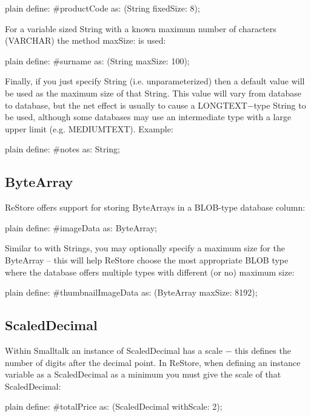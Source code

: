 \documentclass[10pt,twoside,english]{_support/latex/sbabook/sbabook}
\begin{document}
\begin{displaycode}{plain}
	define: #productCode as: (String fixedSize: 8);
\end{displaycode}

For a variable sized String with a known maximum number of characters (VARCHAR) the method maxSize: is used:

\begin{displaycode}{plain}
define: #surname as: (String maxSize: 100);
\end{displaycode}

Finally, if you just specify String (i.e. unparameterized) then a default value will be used as the maximum size of that String. This value will vary from database to database, but the net effect is usually to cause a LONGTEXT−type String to be used, although some databases may use an intermediate type with a large upper limit (e.g. MEDIUMTEXT). Example: 

\begin{displaycode}{plain}
	define: #notes as: String;
\end{displaycode}
\subsection{ByteArray}
ReStore offers support for storing ByteArrays in a BLOB-type database column:

\begin{displaycode}{plain}
	define: #imageData as: ByteArray;
\end{displaycode}

Similar to with Strings, you may optionally specify a maximum size for the ByteArray – this will help ReStore choose the most appropriate BLOB type where the database offers multiple types with different (or no) maximum size:

\begin{displaycode}{plain}
	define: #thumbnailImageData as: (ByteArray maxSize: 8192);
\end{displaycode}
\subsection{ScaledDecimal}
Within Smalltalk an instance of ScaledDecimal has a scale − this defines the number of digits after the decimal point. In ReStore, when defining an instance variable as a ScaledDecimal as a minimum you must give the scale of that ScaledDecimal: 

\begin{displaycode}{plain}
	define: #totalPrice as: (ScaledDecimal withScale: 2);
\end{displaycode}
\end{document}
